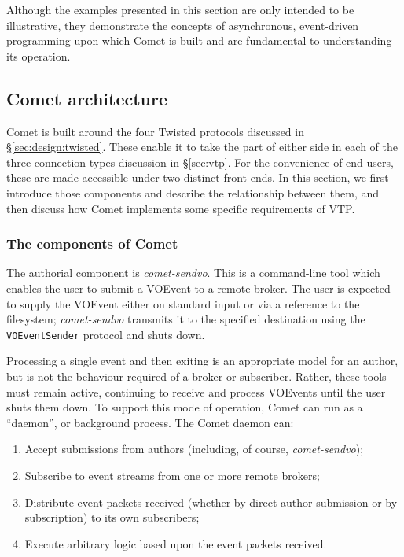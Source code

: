\documentclass[5p,authoryear]{elsarticle}
\begin{document}
Although the examples presented in this section are only intended to be
illustrative, they demonstrate the concepts of asynchronous, event-driven
programming upon which Comet is built and are fundamental to understanding its
operation.

\subsection{Comet architecture}
\label{sec:design:architecture}

Comet is built around the four Twisted protocols discussed in
\S\ref{sec:design:twisted}. These enable it to take the part of either side in
each of the three connection types discussion in \S\ref{sec:vtp}. For the
convenience of end users, these are made accessible under two distinct front
ends. In this section, we first introduce those components and describe the
relationship between them, and then discuss how Comet implements some specific
requirements of VTP.

\subsubsection{The components of Comet}
\label{sec:design:components}

The authorial component is \textit{comet-sendvo}. This is a command-line tool
which enables the user to submit a VOEvent to a remote broker. The user is
expected to supply the VOEvent either on standard input or via a reference to
the filesystem; \textit{comet-sendvo} transmits it to the specified
destination using the \texttt{VOEventSender} protocol and shuts down.

Processing a single event and then exiting is an appropriate model for an
author, but is not the behaviour required of a broker or subscriber. Rather,
these tools must remain active, continuing to receive and process VOEvents
until the user shuts them down. To support this mode of operation, Comet can
run as a ``daemon'', or background process. The Comet daemon can:

\begin{enumerate}

  \item{Accept submissions from authors (including, of course, \textit{comet-sendvo});}

  \item{Subscribe to event streams from one or more remote brokers;}

  \item{Distribute event packets received (whether by direct author submission or by subscription) to its own subscribers;}

  \item{Execute arbitrary logic based upon the event packets received.}

\end{enumerate}
\end{document}
